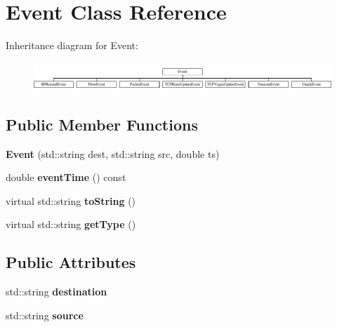 \hypertarget{classEvent}{\section{\-Event \-Class \-Reference}
\label{classEvent}
}
\-Inheritance diagram for \-Event\-:\begin{figure}[H]
\begin{center}
\leavevmode
\includegraphics[height=1.059603cm]{classEvent}
\end{center}
\end{figure}
\subsection*{\-Public \-Member \-Functions}
\begin{DoxyCompactItemize}
\item 
\hypertarget{classEvent_a2ff6ddc14b006baade2b5ab2a622835d}{{\bfseries \-Event} (std\-::string dest, std\-::string src, double ts)}\label{classEvent_a2ff6ddc14b006baade2b5ab2a622835d}

\item 
\hypertarget{classEvent_a79ba42604867e6f81ec29d9eaff0dc08}{double {\bfseries event\-Time} () const }\label{classEvent_a79ba42604867e6f81ec29d9eaff0dc08}

\item 
\hypertarget{classEvent_a924194a887aa70888e08a04b69389bd6}{virtual std\-::string {\bfseries to\-String} ()}\label{classEvent_a924194a887aa70888e08a04b69389bd6}

\item 
\hypertarget{classEvent_a3e3dfee48cea1b42321adae3c51f82e2}{virtual std\-::string {\bfseries get\-Type} ()}\label{classEvent_a3e3dfee48cea1b42321adae3c51f82e2}

\end{DoxyCompactItemize}
\subsection*{\-Public \-Attributes}
\begin{DoxyCompactItemize}
\item 
\hypertarget{classEvent_aa28be1a89b2516ea9f570ff619f754bc}{std\-::string {\bfseries destination}}\label{classEvent_aa28be1a89b2516ea9f570ff619f754bc}

\item 
\hypertarget{classEvent_abc9c246c173d3433d2ffc0a4ed35bc01}{std\-::string {\bfseries source}}\label{classEvent_abc9c246c173d3433d2ffc0a4ed35bc01}

\end{DoxyCompactItemize}
